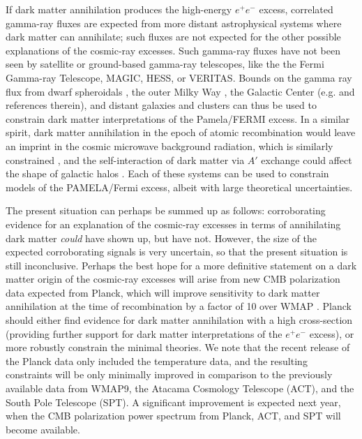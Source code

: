 If dark matter annihilation produces the high-energy $e^+e^-$ excess, correlated gamma-ray fluxes are expected from more distant astrophysical systems where dark matter can annihilate; such fluxes are not expected for the other possible explanations of the cosmic-ray excesses.  Such gamma-ray fluxes have not been seen by satellite or ground-based gamma-ray telescopes, like the the Fermi Gamma-ray Telescope, MAGIC, HESS, or VERITAS.  Bounds on the gamma ray flux from dwarf spheroidals \cite{Ackermann:2011wa}, the outer Milky Way \cite{DiffuseGalactic}, the Galactic Center (e.g. \cite{Papucci:2009gd,Hutsi:2010ai} and references therein), and distant galaxies \cite{Hutsi:2010ai,Zavala:2011tt} and clusters \cite{Huang:2011xr} can thus be used to constrain dark matter interpretations of the Pamela/FERMI excess.  
In a similar spirit, dark matter annihilation in the epoch of atomic recombination would leave an imprint in the cosmic microwave background radiation, which is similarly constrained \cite{CMBrefs}, and the self-interaction of dark matter via $A'$ exchange could affect the shape of galactic halos \cite{Feng:2009hw,Buckley:2009in}.  Each of these systems can be used to constrain models of the PAMELA/Fermi excess, albeit with large theoretical uncertainties.  

The present situation can perhaps be summed up as follows: corroborating evidence for an explanation of the cosmic-ray excesses 
in terms of annihilating dark matter 
\emph{could} have shown up, but have not.  However, the size of the expected corroborating signals is very uncertain, so that the 
present situation is still inconclusive. 
Perhaps the best hope for a more definitive statement on a dark matter origin of the cosmic-ray excesses will arise from new CMB polarization data 
expected from Planck, which will improve sensitivity to dark matter annihilation at the time of recombination by a factor of 10 over WMAP \cite{CMBrefs}.  Planck should either find evidence for dark matter annihilation with a high cross-section (providing further support for dark matter interpretations of the $e^+e^-$ excess), or more robustly constrain the minimal theories.  
We note that the recent release of the Planck data only included the temperature data, and the resulting constraints will be 
only minimally improved in comparison to the previously available data from WMAP9, the Atacama Cosmology Telescope (ACT), and the 
South Pole Telescope (SPT).  A significant improvement is expected next year, when the CMB polarization power spectrum from 
Planck, ACT, and SPT will become available.  

